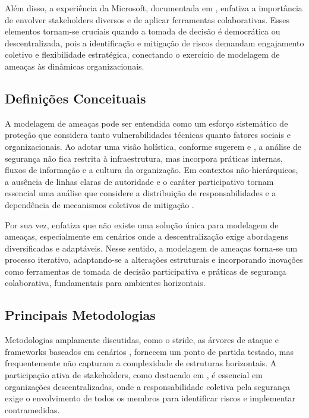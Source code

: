 Além disso, a experiência da Microsoft, documentada em
\cite{ExperiencesThreatModelingAtMicrosoft}, enfatiza a importância de
envolver stakeholders diversos e de aplicar ferramentas colaborativas.
Esses elementos tornam-se cruciais quando a tomada de decisão é
democrática ou descentralizada, pois a identificação e mitigação de
riscos demandam engajamento coletivo e flexibilidade estratégica,
conectando o exercício de modelagem de ameaças às dinâmicas
organizacionais.

\subsection{Definições Conceituais} 
\label{sec:definicoes_conceituais}

A modelagem de ameaças pode ser entendida como um esforço sistemático de
proteção que considera tanto vulnerabilidades técnicas quanto fatores
sociais e organizacionais. Ao adotar uma visão holística, conforme sugerem
\cite{ThreatModelingAsABasisForSecurityRequirements} e
\cite{AdvancedThreatModeling}, a análise de segurança não fica restrita à
infraestrutura, mas incorpora práticas internas, fluxos de informação e a
cultura da organização. Em contextos não-hierárquicos, a ausência de linhas
claras de autoridade e o caráter participativo tornam essencial uma análise
que considere a distribuição de responsabilidades e a dependência de
mecanismos coletivos de mitigação \cite{Colbac}.

Por sua vez, \cite{DemystifyingTheThreatModelingProcess} enfatiza que não
existe uma solução única para modelagem de ameaças, especialmente em
cenários onde a descentralização exige abordagens diversificadas e
adaptáveis. Nesse sentido, a modelagem de ameaças torna-se um processo
iterativo, adaptando-se a alterações estruturais e incorporando inovações
como ferramentas de tomada de decisão participativa e práticas de segurança
colaborativa, fundamentais para ambientes horizontais.


\subsection{Principais Metodologias}
\label{sec:principais_metodologias}

Metodologias amplamente discutidas, como o \gls{stride}, as árvores de
ataque e frameworks baseados em cenários
\cite{EvaluationofCompetingThreatModeling}, fornecem um ponto de partida
testado, mas frequentemente não capturam a complexidade de estruturas
horizontais. A participação ativa de stakeholders, como destacado em
\cite{ParticipatoryThreatModelling}, é essencial em organizações
descentralizadas, onde a responsabilidade coletiva pela segurança exige o
envolvimento de todos os membros para identificar riscos e implementar
contramedidas.

